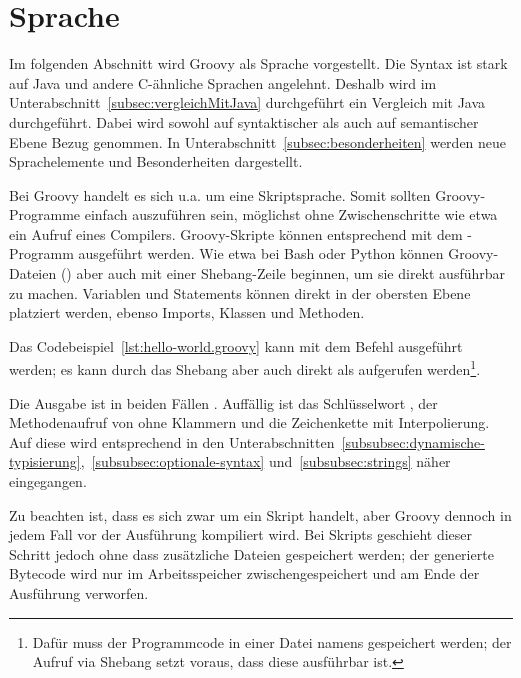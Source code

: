 	\section{Sprache}\label{sec:sprache}

	Im folgenden Abschnitt wird Groovy als Sprache vorgestellt.
	Die Syntax ist stark auf Java und andere C-ähnliche Sprachen angelehnt.
	Deshalb wird im Unterabschnitt~\ref{subsec:vergleichMitJava} durchgeführt ein Vergleich mit Java durchgeführt.
	Dabei wird sowohl auf syntaktischer als auch auf semantischer Ebene Bezug genommen.
	In Unterabschnitt~\ref{subsec:besonderheiten} werden neue Sprachelemente und Besonderheiten dargestellt.

	Bei Groovy handelt es sich {u.a.} um eine Skriptsprache.
	Somit sollten Groovy-Programme einfach auszuführen sein, möglichst ohne Zwischenschritte wie etwa ein Aufruf eines Compilers.
	Groovy-Skripte können entsprechend mit dem -Programm ausgeführt werden.
	Wie etwa bei Bash oder Python können Groovy-Dateien () aber auch mit einer Shebang-Zeile beginnen, um sie direkt ausführbar zu machen.
	Variablen und Statements können direkt in der obersten Ebene platziert werden, ebenso Imports, Klassen und Methoden.


	Das Codebeispiel~\ref{lst:hello-world.groovy} kann mit dem Befehl   ausgeführt werden;
	es kann durch das Shebang aber auch direkt als  aufgerufen werden\footnote{Dafür muss der Programmcode in einer Datei namens  gespeichert werden;
	der Aufruf via Shebang setzt voraus, dass diese ausführbar ist.}.

	Die Ausgabe ist in beiden Fällen .
	Auffällig ist das Schlüsselwort , der Methodenaufruf von  ohne Klammern und die Zeichenkette mit Interpolierung.
	Auf diese wird entsprechend in den Unterabschnitten~\ref{subsubsec:dynamische-typisierung},~\ref{subsubsec:optionale-syntax} und~\ref{subsubsec:strings} näher eingegangen.

	Zu beachten ist, dass es sich zwar um ein Skript handelt, aber Groovy dennoch in jedem Fall vor der Ausführung kompiliert wird.
	Bei Skripts geschieht dieser Schritt jedoch ohne dass zusätzliche Dateien gespeichert werden;
	der generierte Bytecode wird nur im Arbeitsspeicher zwischengespeichert und am Ende der Ausführung verworfen.

